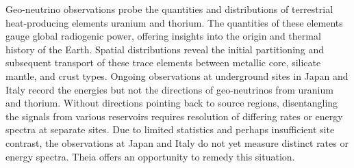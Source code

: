 Geo-neutrino observations probe the quantities and distributions of terrestrial heat-producing elements uranium and thorium. The quantities of these elements gauge global radiogenic power, offering insights into the origin and thermal history of the Earth. Spatial distributions reveal the initial partitioning and subsequent transport of these trace elements between metallic core, silicate mantle, and crust types. Ongoing observations at underground sites in Japan and Italy record the energies but not the directions of geo-neutrinos from uranium and thorium. Without directions pointing back to source regions, disentangling the signals from various reservoirs requires resolution of differing rates or energy spectra at separate sites. Due to limited statistics and perhaps insufficient site contrast, the observations at Japan and Italy do not yet measure distinct rates or energy spectra. Theia offers an opportunity to remedy this situation.
